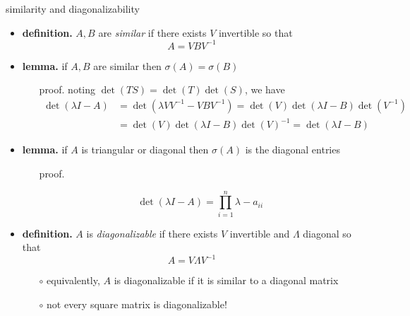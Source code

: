 \documentclass[10pt,hyperref]{beamer}
\begin{document}
\begin{frame}{similarity and diagonalizability}

\begin{itemize}
\item \textbf{definition.} $A,B$ are \emph{similar} if there exists $V$ invertible so that
    $$A = V B V^{-1}$$
\item \textbf{lemma.} if $A,B$ are similar then $\sigma(A)=\sigma(B)$
    \begin{itemize}
    \item[proof.] noting $\det(TS)=\det(T)\det(S)$, we have
\begin{align*}
\det(\lambda I - A) &= \det(\lambda VV^{-1} - V B V^{-1}) = \det(V) \det(\lambda I - B) \det(V^{-1}) \\
    &= \det(V) \det(\lambda I - B) \det(V)^{-1} = \det(\lambda I - B)
\end{align*}
    \end{itemize}
\item \textbf{lemma.} if $A$ is triangular or diagonal then $\sigma(A)$ is the diagonal entries
    \begin{itemize}
    \item[proof.]

    $$\det(\lambda I - A) = \prod_{i=1}^n \lambda-a_{ii}$$
    \end{itemize}
\item \textbf{definition.} $A$ is \emph{diagonalizable} if there exists $V$ invertible and $\Lambda$ diagonal so that
    $$A = V \Lambda V^{-1}$$

    \begin{itemize}
    \item[$\circ$] equivalently, $A$ is diagonalizable if it is similar to a diagonal matrix
    \item[$\circ$] not every square matrix is diagonalizable!
    \end{itemize}
\end{itemize}
\end{frame}
\end{document}
